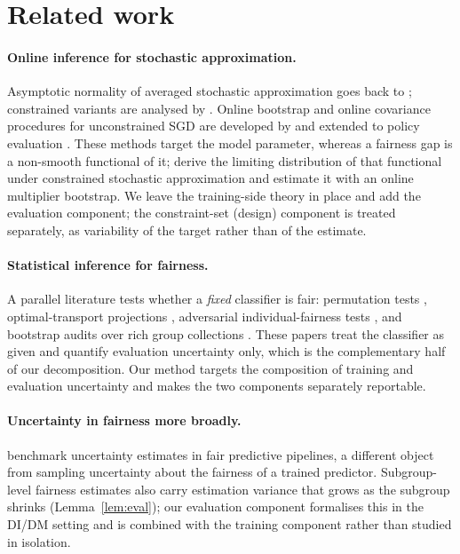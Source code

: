 \documentclass[11pt]{article}
\begin{document}
\section{Related work}
\label{sec:related}

\paragraph{Online inference for stochastic approximation.}
Asymptotic normality of averaged stochastic approximation goes back to
\citet{polyak1992}; constrained variants are analysed by \citet{duchi2016}.  Online bootstrap and
online covariance procedures for unconstrained SGD are developed by \citet{fang2018,chen2016,zhu2021} and
extended to policy evaluation \citep{ramprasad2023}.  These methods target the model parameter, whereas a fairness gap is a non-smooth functional of it;
\citet{roy2026uq} derive the limiting distribution of that functional under constrained stochastic
approximation and estimate it with an online multiplier bootstrap.  We leave
the training-side theory in place and add the evaluation component; the constraint-set (design)
component is treated separately, as variability of the target rather than of the estimate.

\paragraph{Statistical inference for fairness.}
A parallel literature tests whether a \emph{fixed} classifier is fair: permutation tests
\citep{diciccio2020}, optimal-transport projections \citep{taskesen2021}, adversarial individual-fairness
tests \citep{maity2021}, and bootstrap audits over rich group collections \citep{cherian2023}.  These
papers treat the classifier as given and quantify evaluation uncertainty only, which is the
complementary half of our decomposition.  Our method targets the composition of training and
evaluation uncertainty and makes the two components separately reportable.

\paragraph{Uncertainty in fairness more broadly.}
\citet{rosenblatt2024} benchmark uncertainty estimates in fair predictive pipelines, a different
object from sampling uncertainty about the fairness of a trained predictor.  Subgroup-level fairness estimates also carry
estimation variance that grows as the subgroup shrinks (Lemma~\ref{lem:eval}); our evaluation
component formalises this in the DI/DM setting and is combined with the training component rather
than studied in isolation.
\end{document}
